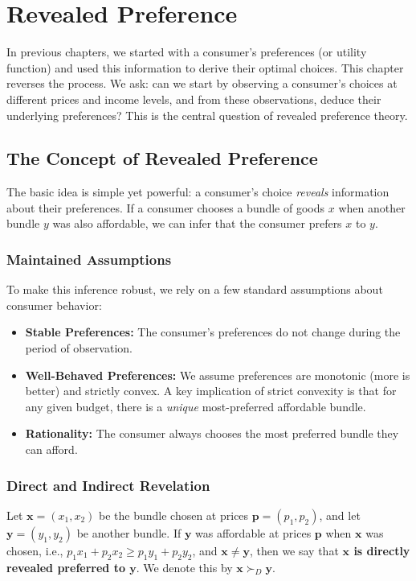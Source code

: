 \chapter{Revealed Preference}\label{chap:revealed_preference}

In previous chapters, we started with a consumer's preferences (or utility function) and used this information to derive their optimal choices. This chapter reverses the process. We ask: can we start by observing a consumer's choices at different prices and income levels, and from these observations, deduce their underlying preferences? This is the central question of revealed preference theory.

\section{The Concept of Revealed Preference}

The basic idea is simple yet powerful: a consumer's choice \textit{reveals} information about their preferences. If a consumer chooses a bundle of goods \(x\) when another bundle \(y\) was also affordable, we can infer that the consumer prefers \(x\) to \(y\).

\subsection{Maintained Assumptions}
To make this inference robust, we rely on a few standard assumptions about consumer behavior:
\begin{itemize}
    \item \textbf{Stable Preferences:} The consumer's preferences do not change during the period of observation.
    \item \textbf{Well-Behaved Preferences:} We assume preferences are monotonic (more is better) and strictly convex. A key implication of strict convexity is that for any given budget, there is a \textit{unique} most-preferred affordable bundle.
    \item \textbf{Rationality:} The consumer always chooses the most preferred bundle they can afford.
\end{itemize}

\subsection{Direct and Indirect Revelation}

\begin{definition}
    Let \(\mathbf{x} = (x_1, x_2)\) be the bundle chosen at prices \(\mathbf{p} = (p_1, p_2)\), and let \(\mathbf{y} = (y_1, y_2)\) be another bundle. If \(\mathbf{y}\) was affordable at prices \(\mathbf{p}\) when \(\mathbf{x}\) was chosen, i.e., \(p_1 x_1 + p_2 x_2 \geq p_1 y_1 + p_2 y_2\), and \(\mathbf{x} \neq \mathbf{y}\), then we say that \textbf{\(\mathbf{x}\) is directly revealed preferred to \(\mathbf{y}\)}. We denote this by \(\mathbf{x} \succ_D \mathbf{y}\).
\end{definition}

